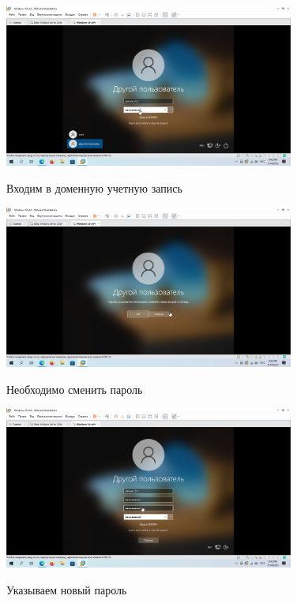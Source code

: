 \documentclass[a4paper]{article}
\begin{document}
  \begin{figure}[H]
    \centering
    \includegraphics[width=0.85\textwidth]{5_0092}
    \label{img:92}
    \caption{Входим в доменную учетную запись}
  \end{figure}

  \begin{figure}[H]
    \centering
    \includegraphics[width=0.85\textwidth]{5_0093}
    \label{img:93}
    \caption{Необходимо сменить пароль}
  \end{figure}

  \begin{figure}[H]
    \centering
    \includegraphics[width=0.85\textwidth]{5_0094}
    \label{img:94}
    \caption{Указываем новый пароль}
  \end{figure}
\end{document}
